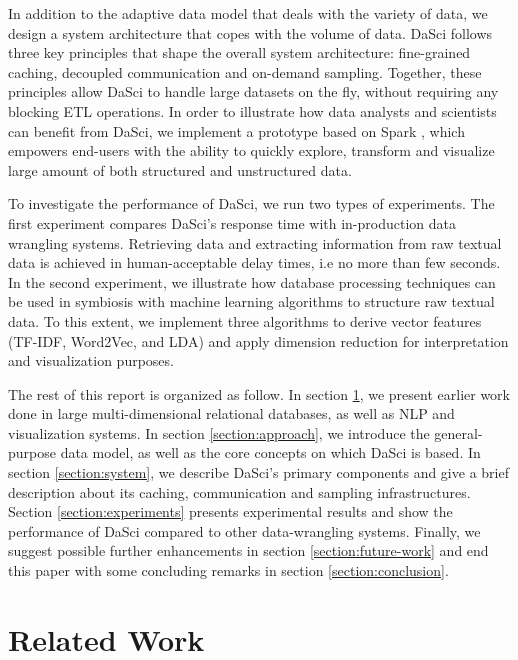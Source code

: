 \documentclass[10pt, a4paper, twocolumn]{article} %
\begin{document}
In addition to the adaptive data model that deals with the variety of data, we design a system architecture that copes with the volume of data. DaSci follows three key principles that shape the overall system architecture: fine-grained caching, decoupled communication and on-demand sampling. Together, these principles allow DaSci to handle large datasets on the fly, without requiring any blocking ETL operations.
In order to illustrate how data analysts and scientists can benefit from DaSci, we implement a prototype based on Spark \cite{spark, rdd}, which empowers end-users with the ability to quickly explore, transform and visualize large amount of both structured and unstructured data.

To investigate the performance of DaSci, we run two types of experiments. The first experiment compares DaSci's response time with in-production data wrangling systems. Retrieving data and extracting information from raw textual data is achieved in human-acceptable delay times, i.e no more than few seconds.
In the second experiment, we illustrate how database processing techniques can be used in symbiosis with machine learning algorithms to structure raw textual data. To this extent, we implement three algorithms to derive vector features (TF-IDF, Word2Vec, and LDA) and apply dimension reduction for interpretation and visualization purposes.

The rest of this report is organized as follow. In section \ref{section:related-work}, we present earlier work done in large multi-dimensional relational databases, as well as NLP and visualization systems. In section \ref{section:approach}, we introduce the general-purpose data model, as well as the core concepts on which DaSci is based. In section \ref{section:system}, we describe DaSci's primary components and give a brief description about its caching, communication and sampling infrastructures. Section \ref{section:experiments} presents experimental results and show the performance of DaSci compared to other data-wrangling systems. Finally, we suggest possible further enhancements in section \ref{section:future-work} and end this paper with some concluding remarks in section \ref{section:conclusion}.


\section{Related Work}
\label{section:related-work}
\end{document}
